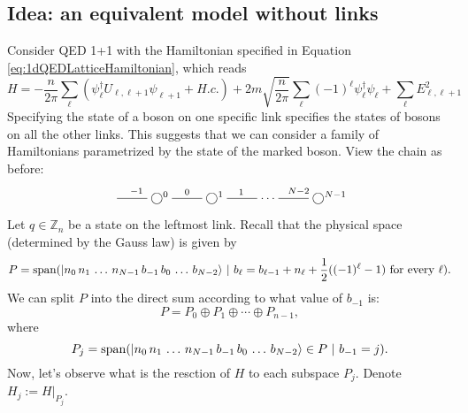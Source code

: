	\subsection{Idea: an equivalent model without links}
	Consider QED 1+1 with the Hamiltonian specified in Equation \ref{eq:1dQEDLatticeHamiltonian}, which reads 
\[
	H=-\frac{n}{2\pi} \sum_\ell (\psi_\ell^\dagger U_{\ell,\ell+1}\psi_{\ell+1}+H.c.) + 2m\sqrt{\frac{n}{2\pi}}\sum_\ell (-1)^\ell \psi_\ell^\dagger\psi_\ell+  \sum_{\ell} E_{\ell,\ell+1}^2
\]
Specifying the state of a boson on one specific link specifies the states of bosons on all the other links. This suggests that we can consider a family of Hamiltonians parametrized by the state of the marked boson. View the chain as before:
	\[
	\xymatrix{
	\ar@{-}[r]^{-1} & \bigcirc^0 \ar@{-}[r]^{0} &  \bigcirc^1 \ar@{-}[r]^{1} & \cdots & \ar@{-}[l]_{N-2} \bigcirc^{N-1}
	}
	\]
	Let $q \in \mathbb Z_n$ be a state on the leftmost link. Recall that the physical space (determined by the Gauss law) is given by
	\[
	P = \operatorname{span} ( |n_0\, n_1\, \ldots \, n_{N-1} \, b_{-1}\, b_0\, \ldots\, b_{N-2}\rangle \ | \ b_{\ell} =b_{\ell-1} + n_{\ell} + \frac{1}{2}((-1)^\ell-1) \ \text{for every} \ \ell).
	\]
	We can split $P$ into the direct sum according to what value of $b_{-1}$ is:
	\[
	P = P_0 \oplus P_1 \oplus \cdots \oplus P_{n-1},
	\]
	where
	\[
	P_j = \operatorname{span}( |n_0\, n_1\, \ldots \, n_{N-1} \, b_{-1}\, b_0\, \ldots\, b_{N-2}\rangle \in P \ | \ b_{-1} = j).
	\]
	Now, let's observe what is the resction of $H$ to each subspace $P_j$. Denote $H_j := H|_{P_j}$.

%
